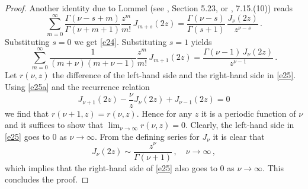 \documentclass[12pt]{amsart}
\theoremstyle{plain}
\theoremstyle{definition}
\numberwithin{equation}{section}
\begin{document}
\begin{proof} 
Another identity  due to Lommel (see \cite{W}, Section 5.23, or \cite{HTF}, 7.15.(10)) reads
%
\begin{equation*}
\sum_{m=0}^\infty  \frac{\Gamma(\nu-s+m)}{\Gamma(\nu+m+1)}
\frac{z^m}{m!} \, J_{m+s}(2z)  =
\frac{\Gamma(\nu-s)}{\Gamma(s+1)} \, \frac{J_\nu(2z)}{z^{\nu-s}}   \,.
\end{equation*}
%
Substituting $s=0$ we get \eqref{e24}. Substituting $s=1$ yields
%
\begin{equation}\label{e25a}
\sum_{m=0}^\infty  \frac1{(m+\nu)(m+\nu-1)} \frac{z^m}{m!} \, J_{m+1}(2z)  =
\frac{\Gamma(\nu-1)\, J_\nu(2z)}{z^{\nu-1}}  \,.  
\end{equation}
%
Let $r(\nu,z)$  the difference of the left-hand side and the right-hand side
in \eqref{e25}. Using \eqref{e25a} and the recurrence relation 
%
\begin{equation}\label{e26}
J_{\nu+1} (2z)-\frac{\nu}{z} J_\nu(2z) + J_{\nu-1} (2z) = 0
\end{equation}
%
we find that $r(\nu+1,z)=r(\nu,z)$. Hence for any $z$ it is a periodic function
of $\nu$ and it suffices to show that $\lim_{\nu\to\infty} r(\nu,z)=0$. 
Clearly, the left-hand side in \eqref{e25} goes to 0 as $\nu\to\infty$. From
the defining series for $J_\nu$ it is clear that
%
\begin{equation}\label{e27}
J_\nu(2z)\sim \frac{z^\nu}{\Gamma(\nu+1)} \,, \quad \nu\to\infty \,,  
\end{equation}
%
which implies that the right-hand side of \eqref{e25} also goes to $0$ as $\nu\to\infty$. 
This concludes the proof. \end{proof}
\end{document}
